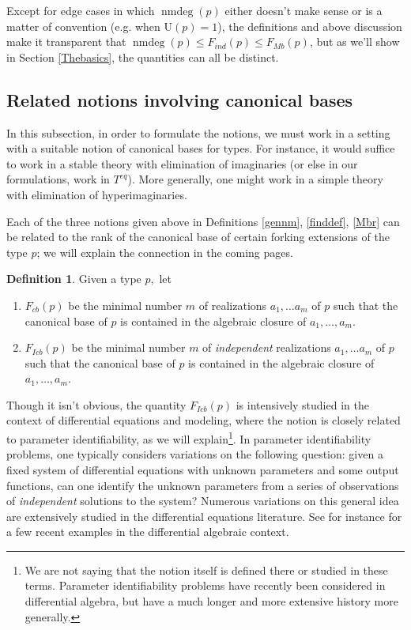 \documentclass[11pt]{amsart}
\def\nmdeg{\mathop{\rm nmdeg}}
\def\nmdeg{\operatorname{nmdeg}}
\newcommand{\Fmb}[1]{F_{Mb}\left( #1  \right)}
\newcommand{\fcb}[1]{F_{cb}\left( #1  \right)}
\newcommand{\ficb}[1]{F_{Icb}\left( #1  \right)}
\theoremstyle{definition}
\newtheorem{definition}[theorem]{Definition}
\theoremstyle{remark}
\newcommand{\U}{\mathrm{U} }
\numberwithin{equation}{section}
\begin{document}
Except for edge cases in which $\nmdeg(p)$ either doesn't make sense or is a matter of convention (e.g. when $\U(p) =1$), the definitions and above discussion make it transparent that $\nmdeg(p) \leq F_{ind} (p) \leq  \Fmb{p}$, but as we'll show in Section \ref{Thebasics}, the quantities can all be distinct. 

\subsection{Related notions involving canonical bases}
In this subsection, in order to formulate the notions, we must work in a setting with a suitable notion of canonical bases for types. For instance, it would suffice to work in a stable theory with elimination of imaginaries (or else in our formulations, work in $T^{eq}$). More generally, one might work in a simple theory with elimination of hyperimaginaries. 

Each of the three notions given above in Definitions \ref{gennm}, \ref{finddef}, \ref{Mbr} can be related to the rank of the canonical base of certain forking extensions of the type $p$; we will explain the connection in the coming pages. 

\begin{definition} \label{CBbounddef} Given a type $p,$ let 

\begin{enumerate} 
 \item $\fcb{p}$ be the minimal number $m$ of realizations $a_1, \ldots a_m$  of $p$ such that the canonical base of $p$ is contained in the algebraic closure of $a_1, \ldots , a_m$.
\item $\ficb{p}$ be the minimal number $m$ of \emph{independent} realizations $a_1, \ldots a_m$  of $p$ such that the canonical base of $p$ is contained in the algebraic closure of $a_1, \ldots , a_m$.
\end{enumerate}
\end{definition}


Though it isn't obvious, the quantity $\ficb{p}$ is intensively studied in the context of differential equations and modeling, where the notion is closely related to parameter identifiability, as we will explain\footnote{We are not saying that the notion itself is defined there or studied in these terms. Parameter identifiability problems have recently been considered in differential algebra, but have a much longer and more extensive history more generally.}. In parameter identifiability problems, one typically considers variations on the following question: given a fixed system of differential equations with unknown parameters and some output functions, can one identify the unknown parameters from a series of observations of \emph{independent} solutions to the system? Numerous variations on this general idea are extensively studied in the differential equations literature. See for instance \cite{dong2023differential, ovchinnikov2021computing, jeronimo2023weak} for a few recent examples in the differential algebraic context.
\end{document}
